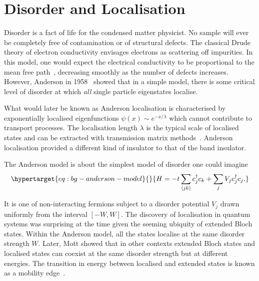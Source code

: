\hypertarget{bg-disorder-and-localisation}{%
\section{Disorder and Localisation}\label{bg-disorder-and-localisation}}

Disorder is a fact of life for the condensed matter physicist. No sample will ever be completely free of contamination or of structural defects. The classical Drude theory of electron conductivity envisages electrons as scattering off impurities. In this model, one would expect the electrical conductivity to be proportional to the mean free path~\autocite{lagendijkFiftyYearsAnderson2009}, decreasing smoothly as the number of defects increases. However, Anderson in 1958~\autocite{andersonAbsenceDiffusionCertain1958} showed that in a simple model, there is some critical level of disorder at which \emph{all} single particle eigenstates localise.

What would later be known as Anderson localisation is characterised by exponentially localised eigenfunctions \(\psi(x) \sim e^{-x/\lambda}\) which cannot contribute to transport processes. The localisation length \(\lambda\) is the typical scale of localised states and can be extracted with transmission matrix methods~\autocite{pendrySymmetryTransportWaves1994}. Anderson localisation provided a different kind of insulator to that of the band insulator.

The Anderson model is about the simplest model of disorder one could imagine \begin{equation}\protect\hypertarget{eq:bg-anderson-model}{}{
H = -t\sum_{\langle jk \rangle} c^\dagger_j c_k + \sum_j V_j c_j^\dagger c_j.
}\label{eq:bg-anderson-model}\end{equation}

It is one of non-interacting fermions subject to a disorder potential \(V_j\) drawn uniformly from the interval \([-W,W]\). The discovery of localisation in quantum systems was surprising at the time given the seeming ubiquity of extended Bloch states. Within the Anderson model, all the states localise at the same disorder strength \(W\). Later, Mott showed that in other contexts extended Bloch states and localised states can coexist at the same disorder strength but at different energies. The transition in energy between localised and extended states is known as a mobility edge~\autocite{mottMetalInsulatorTransitions1978}.


